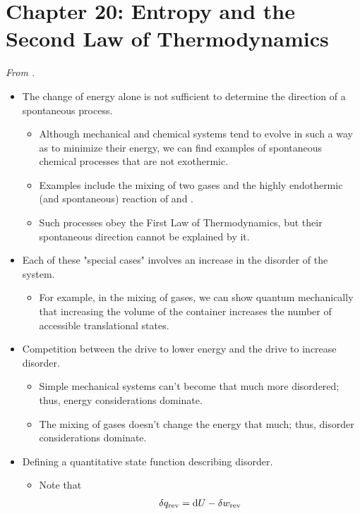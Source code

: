\documentclass[../notes.tex]{subfiles}
\begin{document}
\section{Chapter 20: Entropy and the Second Law of Thermodynamics}
\emph{From \textcite{bib:McQuarrieSimon}.}
\begin{itemize}
    \item {}The change of energy alone is not sufficient to determine the direction of a spontaneous process.
    \begin{itemize}
        \item Although mechanical and chemical systems tend to evolve in such a way as to minimize their energy, we can find examples of spontaneous chemical processes that are not exothermic.
        \item Examples include the mixing of two gases and the highly endothermic (and spontaneous) reaction of  and .
        \item Such processes obey the First Law of Thermodynamics, but their spontaneous direction cannot be explained by it.
    \end{itemize}
    \item Each of these "special cases" involves an increase in the disorder of the system.
    \begin{itemize}
        \item For example, in the mixing of gases, we can show quantum mechanically that increasing the volume of the container increases the number of accessible translational states.
    \end{itemize}
    \item Competition between the drive to lower energy and the drive to increase disorder.
    \begin{itemize}
        \item Simple mechanical systems can't become that much more disordered; thus, energy considerations dominate.
        \item The mixing of gases doesn't change the energy that much; thus, disorder considerations dominate.
    \end{itemize}
    \item Defining a quantitative state function describing disorder.
    \begin{itemize}
        \item Note that
        \begin{align*}
            \var{q_\text{rev}} &= \dd{U}-\var{w_\text{rev}}\\

\end{align*}
\end{itemize}
\end{itemize}
\end{document}
